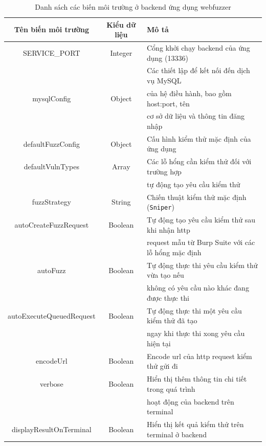 \begin{table}[ht]
    \centering
    \caption{Danh sách các biến môi trường ở backend ứng dụng webfuzzer}
    \label{tab:env-variables-backend}
    \begin{tabular}[ht]{ccl}
        \toprule[1pt]\midrule[0.3pt]
            \textbf{Tên biến môi trường}&\textbf{Kiểu dữ liệu}&\textbf{Mô tả}\\
        \midrule
            SERVICE\_PORT&Integer&Cổng khởi chạy backend của ứng dụng (13336)\\
            \addlinespace
            {}&{}&Các thiết lập để kết nối đến dịch vụ MySQL\\
            mysqlConfig&Object&của hệ điều hành, bao gồm host:port, tên\\
            {}&{}&cơ sở dữ liệu và thông tin đăng nhập\\
            \addlinespace
            defaultFuzzConfig&Object&Cấu hình kiểm thử mặc định của ứng dụng\\
            \addlinespace
            defaultVulnTypes&Array&Các lỗ hổng cần kiểm thử đối với trường hợp\\
            {}&{}&tự động tạo yêu cầu kiểm thử\\
            \addlinespace
            fuzzStrategy&String&Chiến thuật kiểm thử mặc định (\texttt{Sniper})\\
            \addlinespace
            autoCreateFuzzRequest&Boolean&Tự động tạo yêu cầu kiểm thử sau khi nhận \acrshort{http}\\
            {}&{}&request mẫu từ Burp Suite với các lỗ hổng mặc định\\
            \addlinespace
            autoFuzz&Boolean&Tự động thực thi yêu cầu kiểm thử vừa tạo nếu\\
            {}&{}&không có yêu cầu nào khác đang được thực thi\\
            \addlinespace
            autoExecuteQueuedRequest&Boolean&Tự động thực thi một yêu cầu kiểm thử đã tạo\\
            {}&{}&ngay khi thực thi xong yêu cầu hiện tại\\
            \addlinespace
            encodeUrl&Boolean&Encode \acrshort{url} của \acrshort{http} request kiểm thử gửi đi\\
            \addlinespace
            verbose&Boolean&Hiển thị thêm thông tin chi tiết trong quá trình\\
            {}&{}&hoạt động của backend trên terminal\\
            \addlinespace
            displayResultOnTerminal&Boolean&Hiển thị kết quả kiểm thử trên terminal ở backend\\
        \midrule[0.3pt]\bottomrule[1pt]
    \end{tabular}
\end{table}
\FloatBarrier

